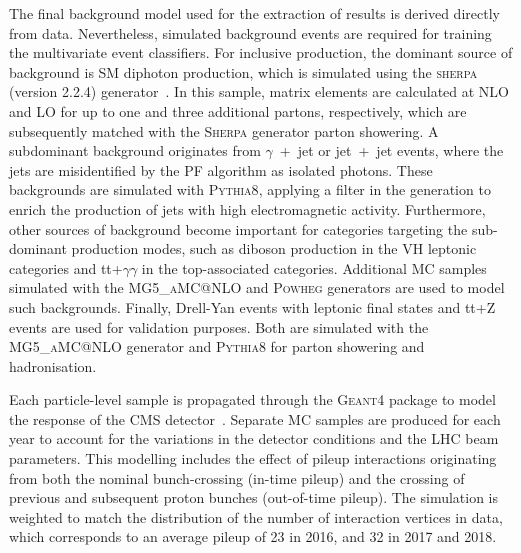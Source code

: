 The final background model used for the extraction of results is derived directly from data. Nevertheless, simulated background events are required for training the multivariate event classifiers. For inclusive production, the dominant source of background is SM diphoton production, which is simulated using the \textsc{sherpa} (version 2.2.4) generator~\cite{Gleisberg:2008ta}. In this sample, matrix elements are calculated at NLO and LO for up to one and three additional partons, respectively, which are subsequently matched with the \textsc{Sherpa} generator parton showering. A subdominant background originates from $\gamma$~+~jet or jet~+~jet events, where the jets are misidentified by the PF algorithm as isolated photons. These backgrounds are simulated with \textsc{Pythia8}, applying a filter in the generation to enrich the production of jets with high electromagnetic activity. Furthermore, other sources of background become important for categories targeting the sub-dominant production modes, such as diboson production in the VH leptonic categories and tt+$\gamma\gamma$ in the top-associated categories. Additional MC samples simulated with the \textsc{MG5\_aMC@NLO} and \textsc{Powheg} generators are used to model such backgrounds. Finally, Drell-Yan events with leptonic final states and tt+Z events are used for validation purposes. Both are simulated with the \textsc{MG5\_aMC@NLO} generator and \textsc{Pythia8} for parton showering and hadronisation.

Each particle-level sample is propagated through the \textsc{Geant4} package to model the response of the CMS detector~\cite{Agostinelli:2002hh}. Separate MC samples are produced for each year to account for the variations in the detector conditions and the LHC beam parameters. This modelling includes the effect of pileup interactions originating from both the nominal bunch-crossing (in-time pileup) and the crossing of previous and subsequent proton bunches (out-of-time pileup). The simulation is weighted to match the distribution of the number of interaction vertices in data, which corresponds to an average pileup of 23 in 2016, and 32 in 2017 and 2018.


